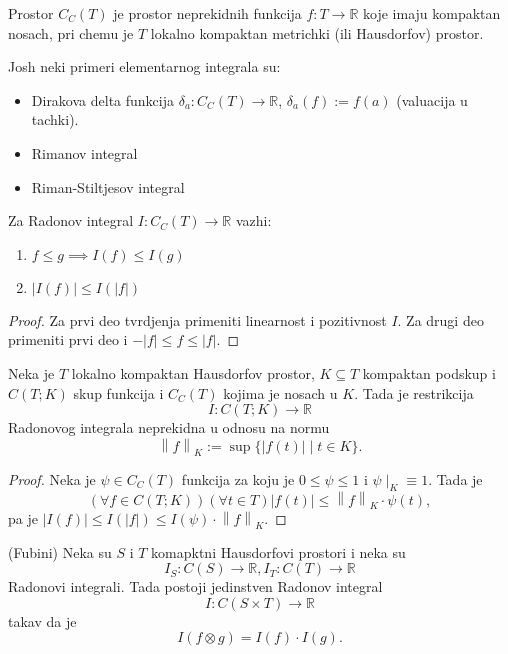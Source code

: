 \documentclass[a4paper,12pt]{article}
\newcommand{\RR}{\mathbb{R}}
\newcommand{\psj}{\subseteq}
\newcommand{\norm}[1]{\left\lVert#1\right\rVert}
\begin{document}
\begin{nap}
	Prostor $C_C(T)$ je prostor neprekidnih funkcija $f:T\to \RR$ koje imaju kompaktan nosach, pri chemu je 
	$T$ lokalno kompaktan metrichki (ili Hausdorfov) prostor.
\end{nap}

\begin{pr}
	Josh neki primeri elementarnog integrala su:
	\begin{itemize}
		\item Dirakova delta funkcija $\delta_a: C_C(T)\to \RR$, $\delta_a(f):=f(a)$ (valuacija u tachki).
		\item Rimanov integral
		\item Riman-Stiltjesov integral
	\end{itemize}
\end{pr}

\begin{lema}
	Za Radonov integral $I: C_C(T) \to \RR$ vazhi:
	\begin{enumerate}
		\item $f \leq g \implies I(f) \leq I(g)$
		\item $|I(f)| \leq I(|f|)$
	\end{enumerate}
\end{lema}
\begin{proof}
	Za prvi deo tvrdjenja primeniti linearnost i pozitivnost $I$. Za drugi deo primeniti prvi deo i $-|f| \leq f \leq |f|$.
\end{proof}

\begin{tvr}
	Neka je $T$ lokalno kompaktan Hausdorfov prostor, $K \psj T$ kompaktan podskup i $C(T; K)$ skup funkcija i $C_C(T)$
	kojima je nosach u $K$. Tada je restrikcija
	\[ I:C(T;K) \to \RR \] 
	Radonovog integrala neprekidna u odnosu na normu
	\[ \norm{f}_K := \sup\{|f(t)| \mid t\in K\} .\] 
\end{tvr}
\begin{proof}
	Neka je $\psi \in  C_C(T)$ funkcija za koju je $0 \leq \psi \leq 1$ i $\psi \mid_{K} \equiv 1$. Tada je 
	\[ (\forall f \in C(T; K))(\forall t \in T) |f(t)| \leq \norm{f}_K \cdot \psi(t) ,\] 
	pa je $|I(f)| \leq I(|f|) \leq I(\psi) \cdot \norm{f}_K$.
\end{proof}

\begin{tma}(Fubini)
	Neka su $S$ i $T$ komapktni Hausdorfovi prostori i neka su 
	\[ I_S : C(S) \to \RR ,  I_T : C(T) \to \RR\] 
	Radonovi integrali. Tada postoji jedinstven Radonov integral 
	\[ I:C(S\times T) \to \RR \] 
	takav da je 
	\[ I(f\otimes g) = I(f)\cdot I(g) .\] 
\end{tma}
\end{document}
